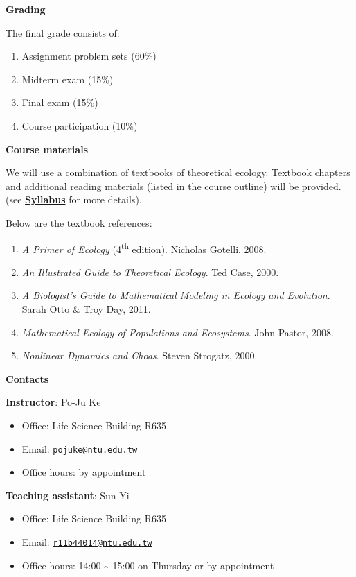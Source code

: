 \documentclass[
]{book}
\providecommand{\tightlist}{%
  \setlength{\itemsep}{0pt}\setlength{\parskip}{0pt}}
\begin{document}
\textbf{Grading}

The final grade consists of:

\begin{enumerate}
\def\labelenumi{(\arabic{enumi})}
\tightlist
\item
  Assignment problem sets (60\%)
\item
  Midterm exam (15\%)
\item
  Final exam (15\%)
\item
  Course participation (10\%)
\end{enumerate}

\textbf{Course materials}

We will use a combination of textbooks of theoretical ecology. Textbook chapters and additional reading materials (listed in the course outline) will be provided. (see \href{https://pojuke.github.io/TheoreticalEcologyPJK/syllabus.html}{\textbf{Syllabus}} for more details).

Below are the textbook references:

\begin{enumerate}
\def\labelenumi{(\arabic{enumi})}
\tightlist
\item
  \emph{A Primer of Ecology} (4\textsuperscript{th} edition). Nicholas Gotelli, 2008.
\item
  \emph{An Illustrated Guide to Theoretical Ecology}. Ted Case, 2000.
\item
  \emph{A Biologist's Guide to Mathematical Modeling in Ecology and Evolution}. Sarah Otto \& Troy Day, 2011.
\item
  \emph{Mathematical Ecology of Populations and Ecosystems}. John Pastor, 2008.
\item
  \emph{Nonlinear Dynamics and Choas}. Steven Strogatz, 2000.
\end{enumerate}

\textbf{Contacts}

\textbf{Instructor}: Po-Ju Ke

\begin{itemize}
\tightlist
\item
  Office: Life Science Building R635
\item
  Email: \href{mailto:pojuke@ntu.edu.tw}{\nolinkurl{pojuke@ntu.edu.tw}}
\item
  Office hours: by appointment
\end{itemize}

\textbf{Teaching assistant}: Sun Yi

\begin{itemize}
\tightlist
\item
  Office: Life Science Building R635
\item
  Email: \href{mailto:r11b44014@ntu.edu.tw}{\nolinkurl{r11b44014@ntu.edu.tw}}
\item
  Office hours: 14:00 \textasciitilde{} 15:00 on Thursday or by appointment
\end{itemize}
\end{document}
